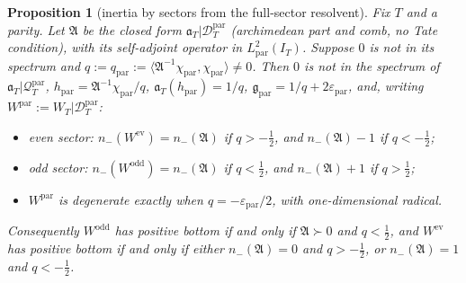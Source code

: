 \documentclass[11pt]{amsart}
\newtheorem{proposition}[theorem]{Proposition}
\theoremstyle{definition}
\theoremstyle{remark}
\newcommand{\IT}{I_T}
\begin{document}
\begin{proposition}[inertia by sectors from the full-sector resolvent]\label{prop:WT}
Fix $T$ and a parity. Let $\mathfrak A$ be the closed form $\mathfrak a_T|\mathcal D^{\mathrm{par}}_T$ (archimedean part and comb,
no Tate condition), with its self-adjoint operator in $L^2_{\mathrm{par}}(\IT)$. Suppose $0$ is not in its spectrum and
$q:=q_{\mathrm{par}}:=\langle\mathfrak A^{-1}\chi_{\mathrm{par}},\chi_{\mathrm{par}}\rangle\ne0$. Then $0$ is not in the spectrum of
$\mathfrak a_T|\mathcal Q^{\mathrm{par}}_T$, $h_{\mathrm{par}}=\mathfrak A^{-1}\chi_{\mathrm{par}}/q$, $\mathfrak a_T(h_{\mathrm{par}})=1/q$,
$\mathfrak g_{\mathrm{par}}=1/q+2\varepsilon_{\mathrm{par}}$, and, writing $W^{\mathrm{par}}:=W_T|\mathcal D^{\mathrm{par}}_T$:
\begin{itemize}
\item[(i)] even sector: $n_-(W^{\mathrm{ev}})=n_-(\mathfrak A)$ if $q>-\frac12$, and $n_-(\mathfrak A)-1$ if $q<-\frac12$;
\item[(ii)] odd sector: $n_-(W^{\mathrm{odd}})=n_-(\mathfrak A)$ if $q<\frac12$, and $n_-(\mathfrak A)+1$ if $q>\frac12$;
\item[(iii)] $W^{\mathrm{par}}$ is degenerate exactly when $q=-\varepsilon_{\mathrm{par}}/2$, with one-dimensional radical.
\end{itemize}
Consequently $W^{\mathrm{odd}}$ has positive bottom if and only if $\mathfrak A\succ0$ and $q<\frac12$, and $W^{\mathrm{ev}}$ has
positive bottom if and only if either $n_-(\mathfrak A)=0$ and $q>-\frac12$, or $n_-(\mathfrak A)=1$ and $q<-\frac12$.
\end{proposition}
\end{document}

